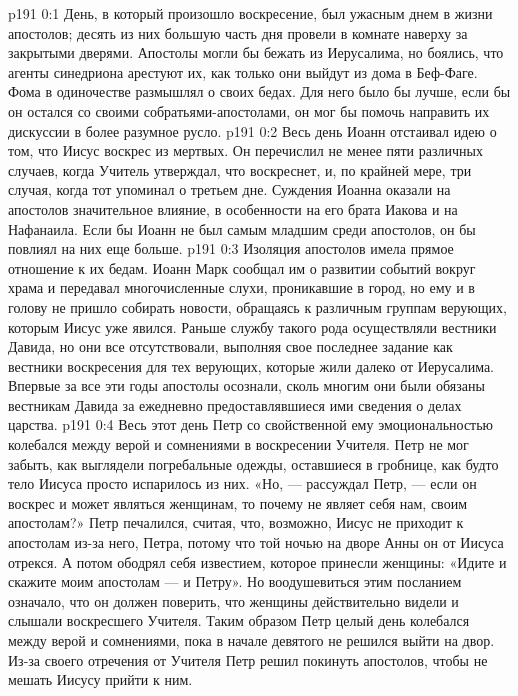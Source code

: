 \author{Комиссия срединников}
\vs p191 0:1 День, в который произошло воскресение, был ужасным днем в жизни апостолов; десять из них большую часть дня провели в комнате наверху за закрытыми дверями. Апостолы могли бы бежать из Иерусалима, но боялись, что агенты синедриона арестуют их, как только они выйдут из дома в Беф\hyp{}Фаге. Фома в одиночестве размышлял о своих бедах. Для него было бы лучше, если бы он остался со своими собратьями\hyp{}апостолами, он мог бы помочь направить их дискуссии в более разумное русло.
\vs p191 0:2 Весь день Иоанн отстаивал идею о том, что Иисус воскрес из мертвых. Он перечислил не менее пяти различных случаев, когда Учитель утверждал, что воскреснет, и, по крайней мере, три случая, когда тот упоминал о третьем дне. Суждения Иоанна оказали на апостолов значительное влияние, в особенности на его брата Иакова и на Нафанаила. Если бы Иоанн не был самым младшим среди апостолов, он бы повлиял на них еще больше.
\vs p191 0:3 Изоляция апостолов имела прямое отношение к их бедам. Иоанн Марк сообщал им о развитии событий вокруг храма и передавал многочисленные слухи, проникавшие в город, но ему и в голову не пришло собирать новости, обращаясь к различным группам верующих, которым Иисус уже явился. Раньше службу такого рода осуществляли вестники Давида, но они все отсутствовали, выполняя свое последнее задание как вестники воскресения для тех верующих, которые жили далеко от Иерусалима. Впервые за все эти годы апостолы осознали, сколь многим они были обязаны вестникам Давида за ежедневно предоставлявшиеся ими сведения о делах царства.
\vs p191 0:4 Весь этот день Петр со свойственной ему эмоциональностью колебался между верой и сомнениями в воскресении Учителя. Петр не мог забыть, как выглядели погребальные одежды, оставшиеся в гробнице, как будто тело Иисуса просто испарилось из них. «Но, --- рассуждал Петр, --- если он воскрес и может являться женщинам, то почему не являет себя нам, своим апостолам?» Петр печалился, считая, что, возможно, Иисус не приходит к апостолам из\hyp{}за него, Петра, потому что той ночью на дворе Анны он от Иисуса отрекся. А потом ободрял себя известием, которое принесли женщины: «Идите и скажите моим апостолам --- и Петру». Но воодушевиться этим посланием означало, что он должен поверить, что женщины действительно видели и слышали воскресшего Учителя. Таким образом Петр целый день колебался между верой и сомнениями, пока в начале девятого не решился выйти на двор. Из\hyp{}за своего отречения от Учителя Петр решил покинуть апостолов, чтобы не мешать Иисусу прийти к ним.
